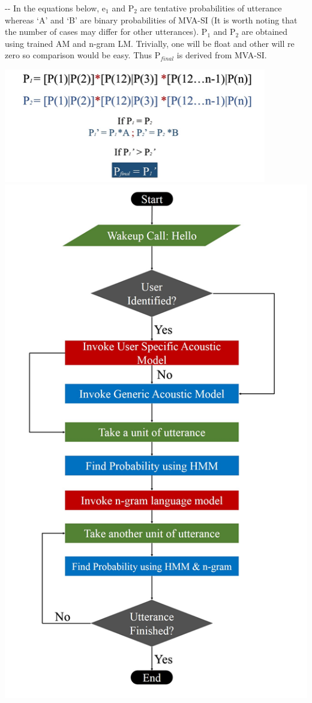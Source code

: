 \documentclass[12pt]{article}
\makeatletter
\newenvironment{indentation}[3]%
	{\par\setlength{\parindent}{#3}
	\setlength{\leftmargin}{#1}       \setlength{\rightmargin}{#2}%
	\advance\linewidth -\leftmargin       \advance\linewidth -\rightmargin%
	\advance\@totalleftmargin\leftmargin  \@setpar{{\@@par}}%
	\parshape 1\@totalleftmargin \linewidth\ignorespaces}{\par}%
\makeatother
\begin{document}
\begin{indentation}{0pt}{0pt}{0pt}
In the equations below, e$_{1}$ and P$_{2}$ are tentative probabilities of
utterance whereas `A' and `B' are binary probabilities of MVA-SI (It is worth
noting that the number of cases may differ for other utterances). P$_{1}$ and
P$_{2}$ are obtained using trained AM and n-gram LM. Trivially, one will be float
and other will re zero so comparison would be easy. Thus P$_{final}$ is derived
from MVA-SI.
\end{indentation}
\includegraphics[width=325pt]{img-15.png}\newline
\includegraphics[width=392pt]{img-16.png}\textbf{{\Large  }}
\end{document}
